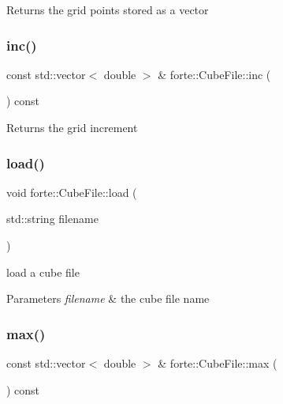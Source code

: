 \begin{DoxyReturn}{Returns}
the grid points stored as a vector 
\end{DoxyReturn}
\mbox{\label{classforte_1_1_cube_file_a9ec8e2d49f08a95023310ec5814d0631}} 
\subsubsection{\texorpdfstring{inc()}{inc()}}
{\footnotesize\ttfamily const std\+::vector$<$ double $>$ \& forte\+::\+Cube\+File\+::inc (\begin{DoxyParamCaption}{ }\end{DoxyParamCaption}) const}

\begin{DoxyReturn}{Returns}
the grid increment 
\end{DoxyReturn}
\mbox{\label{classforte_1_1_cube_file_aa1a220dd0dc464118d874004be847138}} 
\subsubsection{\texorpdfstring{load()}{load()}}
{\footnotesize\ttfamily void forte\+::\+Cube\+File\+::load (\begin{DoxyParamCaption}\item[{std\+::string}]{filename }\end{DoxyParamCaption})}

load a cube file 
\begin{DoxyParams}{Parameters}
{\em filename} & the cube file name \\
\hline
\end{DoxyParams}
\mbox{\label{classforte_1_1_cube_file_ac09285b9257b4a4c4fcf7f1d304ae953}} 
\subsubsection{\texorpdfstring{max()}{max()}}
{\footnotesize\ttfamily const std\+::vector$<$ double $>$ \& forte\+::\+Cube\+File\+::max (\begin{DoxyParamCaption}{ }\end{DoxyParamCaption}) const}

